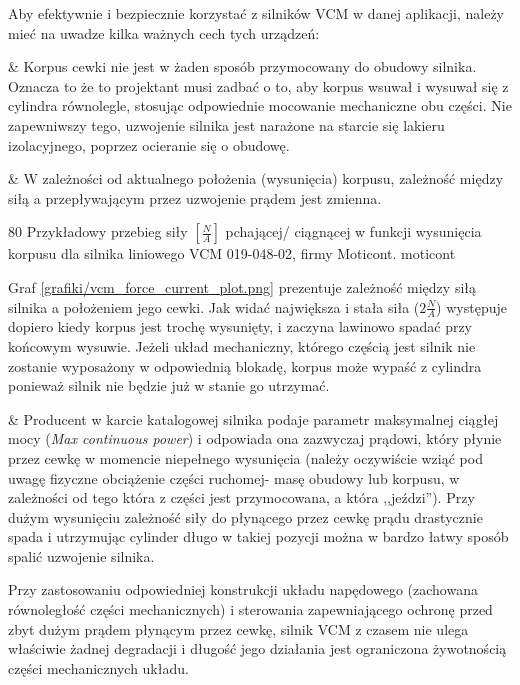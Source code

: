 Aby efektywnie i bezpiecznie korzystać z silników VCM w danej aplikacji, należy mieć na uwadze kilka ważnych cech tych urządzeń:

\begin{easylist}
	& Korpus cewki nie jest w żaden sposób przymocowany do obudowy silnika. Oznacza to że to projektant musi zadbać o to, aby korpus wsuwał i wysuwał się z cylindra równolegle, stosując odpowiednie mocowanie mechaniczne obu części. Nie zapewniwszy tego, uzwojenie silnika jest narażone na starcie się lakieru izolacyjnego, poprzez ocieranie się o obudowę. 
	
	& W zależności od aktualnego położenia (wysunięcia) korpusu, zależność między siłą a przepływającym przez uzwojenie prądem jest zmienna.
	
		{80}
		{Przykładowy przebieg siły $ [\frac{N}{A}] $ pchającej/ ciągnącej w funkcji wysunięcia korpusu dla silnika liniowego VCM 019-048-02, firmy Moticont.}
		{moticont}
	
Graf \ref{grafiki/vcm_force_current_plot.png} prezentuje zależność między siłą silnika a położeniem jego cewki. Jak widać największa i stała siła ($ 2 \frac{N}{A} $) występuje dopiero kiedy korpus jest trochę wysunięty, i zaczyna lawinowo spadać przy końcowym wysuwie. Jeżeli układ mechaniczny, którego częścią jest silnik nie zostanie wyposażony w odpowiednią blokadę, korpus może wypaść z cylindra ponieważ silnik nie będzie już w stanie go utrzymać.

	& Producent w karcie katalogowej silnika podaje parametr maksymalnej ciągłej mocy ({\em Max continuous power}) i odpowiada ona zazwyczaj prądowi, który płynie przez cewkę w momencie niepełnego wysunięcia (należy oczywiście wziąć pod uwagę fizyczne obciążenie części ruchomej- masę obudowy lub korpusu, w zależności od tego która z części jest przymocowana, a która ,,jeździ''). Przy dużym wysunięciu zależność siły do płynącego przez cewkę prądu drastycznie spada i utrzymując cylinder długo w takiej pozycji można w bardzo łatwy sposób spalić uzwojenie silnika. \\
	
\end{easylist}

Przy zastosowaniu odpowiedniej konstrukcji układu napędowego (zachowana równoległość części mechanicznych) i sterowania zapewniającego ochronę przed zbyt dużym prądem płynącym przez cewkę, silnik VCM z czasem nie ulega właściwie żadnej degradacji i długość jego działania jest ograniczona żywotnością części mechanicznych układu.









